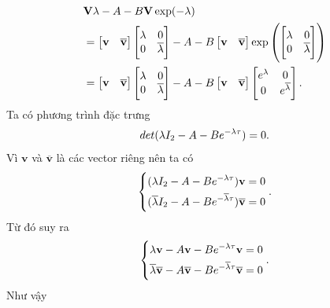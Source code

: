 \begin{align}\label{100}
	&\mathbf{V} \mathbf{\lambda} - A - B \mathbf{V} \exp (-\mathbf{\lambda})\\ \notag
	&= 
	\begin{bmatrix}
		\mathbf{v}&\mathbf{\overline{v}}
	\end{bmatrix}
	\begin{bmatrix}
		\lambda & 0 \\ 0 & \overline{\lambda}
	\end{bmatrix}
	- A - B \begin{bmatrix}
		\mathbf{v}&\mathbf{\overline{v}}
	\end{bmatrix} \exp \left(\begin{bmatrix}
		\lambda & 0 \\ 0 & \overline{\lambda}
	\end{bmatrix}\right)\\ \notag
	&= \begin{bmatrix}
		\mathbf{v}&\mathbf{\overline{v}}
	\end{bmatrix}
	\begin{bmatrix}
		\lambda & 0 \\ 0 & \overline{\lambda}
	\end{bmatrix}
	- A - B \begin{bmatrix}
		\mathbf{v}&\mathbf{\overline{v}}
	\end{bmatrix} \begin{bmatrix}
		e^{\lambda} & 0 \\ 0 & e^{\overline{\lambda}}
	\end{bmatrix}.
\end{align} 
Ta có phương trình đặc trưng
\begin{equation*}
	det(\lambda I_2 -A - Be^{-\lambda \tau}) = 0 .
\end{equation*}
Vì $\mathbf{v}$ và  $\mathbf{\overline{v}}$ là các vector riêng nên ta có
\begin{equation*}
	\left\{\begin{aligned}
		&(\lambda I_2 -A - Be^{-\lambda \tau})\mathbf{v} =0\\
		&(\overline{\lambda} I_2 -A - Be^{-\overline{\lambda} \tau}) \mathbf{\overline{v}} =0\end{aligned}\right. .
\end{equation*}
Từ đó suy ra
\begin{equation*}
	\left\{\begin{aligned}
		&\lambda \mathbf{v} -A\mathbf{v} - Be^{-\lambda \tau}\mathbf{v} =0\\
		&\overline{\lambda}\mathbf{\overline{v}} -A\mathbf{\overline{v}} - Be^{-\overline{\lambda} \tau}\mathbf{\overline{v}} =0\end{aligned}\right. .
\end{equation*}
Như vậy
